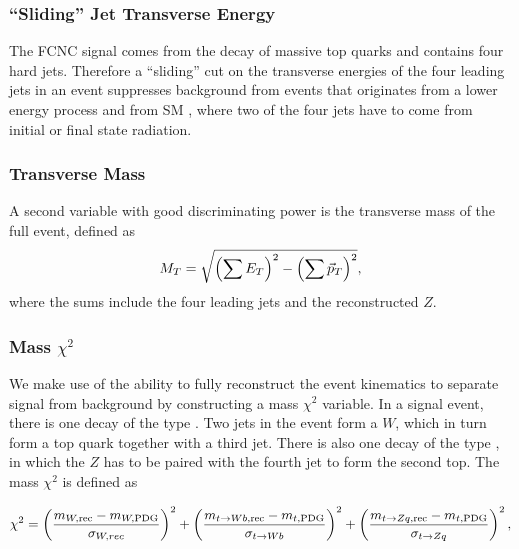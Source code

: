 \subsubsection{``Sliding'' Jet Transverse Energy}
The FCNC signal comes from the decay of massive top quarks and
contains four hard jets. Therefore a ``sliding'' cut on the transverse
energies of the four leading jets in an event suppresses background
from \Zj events that originates from a lower energy process and from
SM \ttbar, where two of the four jets have to come from initial or
final state radiation. 

\subsubsection{Transverse Mass}
A second variable with good discriminating power is the
transverse mass of the full event, defined as
\begin{equation}
  \mt = \sqrt{ \left(\sum\et \right)^2 - \left(\sum\vec{p}_{T}\right)^2 },
\end{equation}
where the sums include the four leading jets and the reconstructed $Z$. 

\subsubsection[Mass $\chi^2$]{Mass \boldmath $\chi^2$\unboldmath}
\label{section:masschi2}
We make use of the ability to fully reconstruct the event kinematics to
separate signal from background by constructing a mass $\chi^2$
variable. In a signal event, there is one decay of the type \tWb.
Two jets in the event form a $W$, which in turn form a top quark together with
a third jet. There is also one decay of the type \tZq, in which the
$Z$ has to be paired with the fourth jet to form the second top. The mass
$\chi^2$ is defined as

\begin{equation}
\chi^2 = 
\left(\frac{m_{W,\mathrm{rec}} - m_{W,\mathrm{PDG}}}{\sigma_{W, rec}} \right)^2 +
\left(\frac{m_{\tWb,\mathrm{rec}} - m_{t,\mathrm{PDG}}}{\sigma_{\tWb}} \right)^2 +
\left(\frac{m_{\tZq,\mathrm{rec}} - m_{t,\mathrm{PDG}}}{\sigma_{\tZq}} \right)^2,
\end{equation}


